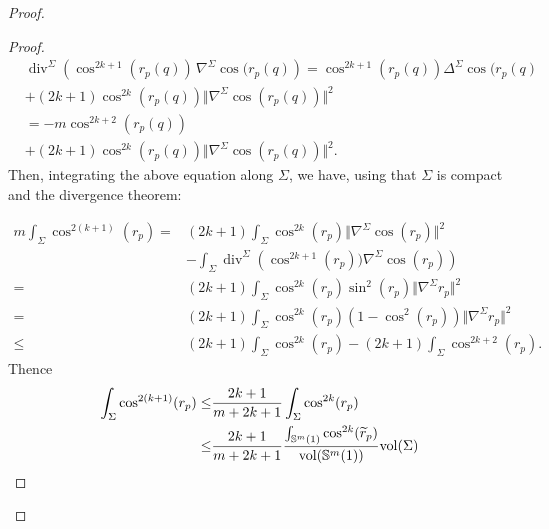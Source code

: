 \documentclass{amsart}
\theoremstyle{definition}
\theoremstyle{remark}
\newcommand{\Div}{\operatorname{div}}
\providecommand{\DIFaddbegin}{} %
\providecommand{\DIFaddend}{} %
\providecommand{\DIFdelbegin}{} %
\providecommand{\DIFdelend}{} %
\begin{document}
\begin{proof}
\begin{proof}
\begin{equation}
\DIFdelbegin %
\DIFdelend \DIFaddbegin \begin{aligned}
&\Div^\Sigma\left(\cos^{2k+1} (r_p(q))\,\nabla^\Sigma \cos(r_p(q)\right)=\cos^{2k+1}(r_p(q))\Delta^\Sigma\cos(r_p(q)\\&+(2k+1) \cos^{2k}(r_p(q))\Vert \nabla^\Sigma \cos(r_p(q))\Vert^2\\
&=-m\cos^{2k+2}(r_p(q))\\&+(2k+1) \cos^{2k}(r_p(q))\Vert \nabla^\Sigma \cos(r_p(q))\Vert^2.
\end{aligned}\DIFaddend 
\end{equation}
Then, integrating the above equation  along $\Sigma$, we have, using that $\Sigma$ is compact and the divergence theorem:

\begin{equation}\label{eqdossBis}
\begin{aligned}
m\int_\Sigma \cos^{2(k+1)}(r_p)=&(2k+1)\int_\Sigma\cos^{2k}(r_p)\Vert \nabla^{\Sigma}  \cos(r_p)\Vert^2\\&-\int_\Sigma \Div^\Sigma\left(\cos^{2k+1}(r_p))\nabla^\Sigma \cos(r_p)\right)
\\
=&(2k+1)\int_\Sigma \cos^{2k}(r_p)\sin^2(r_p)\Vert \nabla^{\Sigma} r_p\Vert^2\\
=&(2k+1)\int_\Sigma \cos^{2k}(r_p)\left(1-\cos^2(r_p)\right)\Vert \nabla^{\Sigma} r_p\Vert^2\\
\leq& (2k+1)\int_\Sigma \cos^{2k}(r_p)-(2k+1)\int_\Sigma \cos^{2k+2}(r_p).
\end{aligned}
\end{equation}
Thence
\begin{equation}\label{eqdoss2Bis}
\begin{aligned}
\int_\Sigma \cos^{2(k+1)}(r_p)\leq &\frac{2k+1}{m+2k+1}\int_\Sigma \cos^{2k}(r_p)\\ 
\leq&  \frac{2k+1}{m+2k+1}\frac{\int_{\mathbb{S}^m(1)} \cos^{2k}(\widetilde{r}_p)}{{\rm vol}(\mathbb{S}^m(1))} {\rm vol}(\Sigma)
\end{aligned}
\end{equation}


\end{proof}
\end{proof}
\end{document}
